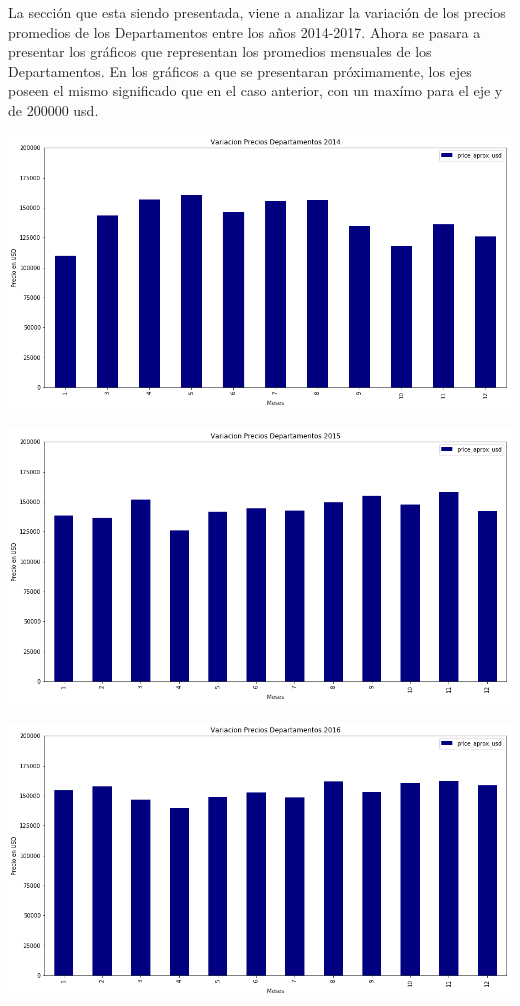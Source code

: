 \documentclass[a4paper, 10pt]{article}
\begin{document}
			La sección que esta siendo presentada, viene a analizar la variación de los precios promedios de los Departamentos entre los años 2014-2017. Ahora se pasara a presentar los gráficos que representan los promedios mensuales de los Departamentos. En los gráficos a que se presentaran próximamente, los ejes poseen el mismo significado que en el caso anterior, con un maxímo para el eje y de 200000 usd. 

			\begin{center}
   		    		\includegraphics[width=\textwidth]{images/vDepto2014}
			\end{center}

			\begin{center}
   		    		\includegraphics[width=\textwidth]{images/vDepto2015}
			\end{center}			
			
			\begin{center}
   		    		\includegraphics[width=\textwidth]{images/vDepto2016}
			\end{center}			
			
\end{document}
